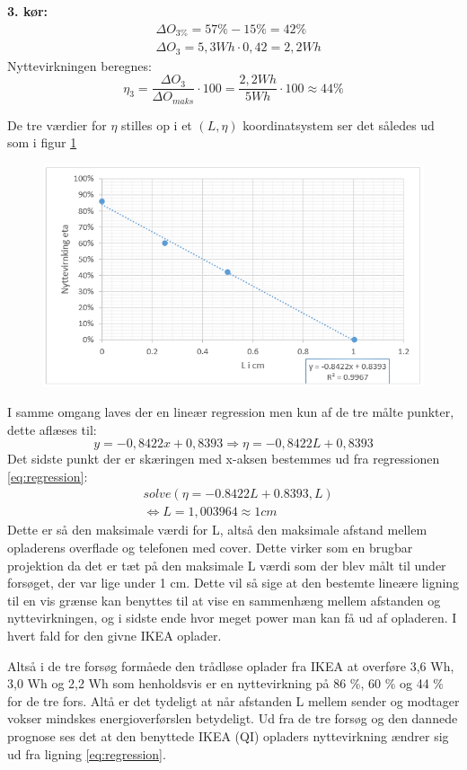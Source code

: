 \textbf{3. kør:}
\begin{align*}
& \Delta O_{3\%} = 57\%-15\% =  42\%  \\
& \Delta O_3 = 5,3 Wh \cdot 0,42 = 2,2 Wh
\end{align*}
Nyttevirkningen beregnes:
\begin{equation}
\eta_3 = \frac{\Delta O_3}{\Delta O_{maks}} \cdot 100 = \frac{2,2 Wh}{5 Wh} \cdot 100 \approx 44 \%
\label{eq:nyt3}
\end{equation}

De tre værdier for $\eta$ stilles op i et $(L,\eta)$ koordinatsystem ser det således ud som i figur \ref{figure:graf4}

\begin{figure}[H]
\includegraphics[width=1\textwidth]{Setup/forsg2_graf4}
\caption{}
\label{figure:graf4}
\end{figure}
I samme omgang laves der en lineær regression men kun af de tre målte punkter, dette aflæses til:
\begin{equation}
y=-0,8422x+0,8393 \Rightarrow \eta = -0,8422L+0,8393
\label{eq:regression}
\end{equation}
Det sidste punkt der er skæringen med x-aksen bestemmes ud fra regressionen \ref{eq:regression}:
\begin{align*}
& solve(\eta =-0.8422L+0.8393,L) \\
& \Leftrightarrow L = 1,003964 \approx 1 cm
\end{align*} 
Dette er så den maksimale værdi for L, altså den maksimale afstand mellem opladerens overflade og telefonen med cover. Dette virker som en brugbar projektion da det er tæt på den maksimale L værdi som der blev målt til under forsøget, der var lige under 1 cm. Dette vil så sige at den bestemte lineære ligning til en vis grænse kan benyttes til at vise en sammenhæng mellem afstanden og nyttevirkningen, og i sidste ende hvor meget power man kan få ud af opladeren. I hvert fald for den givne IKEA oplader.

Altså i de tre forsøg formåede den trådløse oplader fra IKEA at overføre 3,6 Wh, 3,0 Wh og 2,2 Wh som henholdsvis er en nyttevirkning på 86 \%, 60 \% og 44 \% for de tre fors. Altå er det tydeligt at når afstanden L mellem sender og modtager vokser mindskes energioverførslen betydeligt. Ud fra de tre forsøg og den dannede prognose ses det at den benyttede IKEA (QI) opladers nyttevirkning ændrer sig ud fra ligning \ref{eq:regression}.